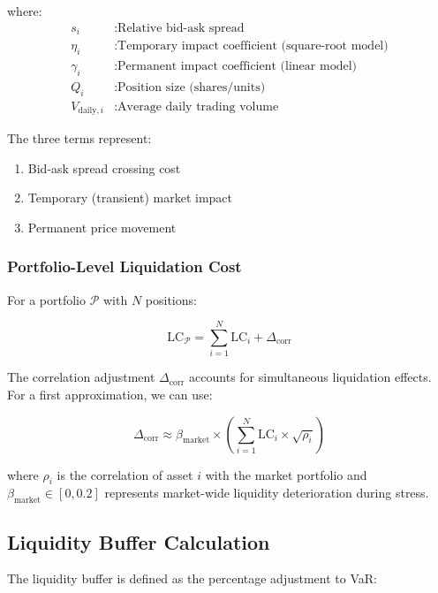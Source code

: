 \documentclass[11pt,a4paper]{article}
\begin{document}
where:
\begin{align*}
s_i &: \text{Relative bid-ask spread} \\
\eta_i &: \text{Temporary impact coefficient (square-root model)} \\
\gamma_i &: \text{Permanent impact coefficient (linear model)} \\
Q_i &: \text{Position size (shares/units)} \\
V_{\text{daily},i} &: \text{Average daily trading volume}
\end{align*}

The three terms represent:
\begin{enumerate}
    \item Bid-ask spread crossing cost
    \item Temporary (transient) market impact
    \item Permanent price movement
\end{enumerate}

\subsubsection{Portfolio-Level Liquidation Cost}

For a portfolio $\mathcal{P}$ with $N$ positions:

\begin{equation}
\text{LC}_\mathcal{P} = \sum_{i=1}^{N} \text{LC}_i + \Delta_{\text{corr}}
\end{equation}

The correlation adjustment $\Delta_{\text{corr}}$ accounts for simultaneous liquidation effects. For a first approximation, we can use:

\begin{equation}
\Delta_{\text{corr}} \approx \beta_{\text{market}} \times \left(\sum_{i=1}^{N} \text{LC}_i \times \sqrt{\rho_i}\right)
\end{equation}

where $\rho_i$ is the correlation of asset $i$ with the market portfolio and $\beta_{\text{market}} \in [0, 0.2]$ represents market-wide liquidity deterioration during stress.

\subsection{Liquidity Buffer Calculation}

The liquidity buffer is defined as the percentage adjustment to VaR:
\end{document}
